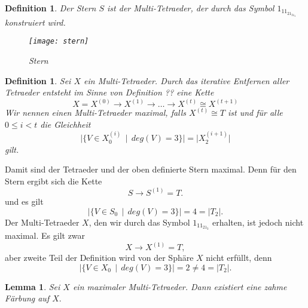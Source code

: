 \documentclass[12pt,titlepage,twoside,cleardoublepage]{article}
\theoremstyle{nummermitklammern}
\newtheorem{lemma}[temp]{Lemma}
\newtheorem{definition}[temp]{Definition}
\newtheorem{definition}[zahl]{Definition}
\newtheorem{lemma}[zahl]{Lemma}
\numberwithin{equation}{section}
\begin{document}
\begin{definition}
Der \emph{Stern} $S$ ist der Multi-Tetraeder, der durch das Symbol $1_11_21_31_4$ konstruiert wird.
\begin{figure}[H]
\begin{center}
\texttt{[image: stern]}
\end{center}
\caption{Stern}
\end{figure}
\end{definition}
\begin{definition}
Sei $X$ ein Multi-Tetraeder. Durch das iterative Entfernen aller Tetraeder entsteht im Sinne von Definition ?? eine Kette 
\[
X=X^{(0)}\to X^{(1)}\to \ldots \to X^{(t)}\cong X^{(t+1)}
\]
Wir nennen einen Multi-Tetraeder \emph{maximal}, falls $X^{(t)}\cong T$ ist und für alle $0\leq i< t$ die Gleichheit
\[
\vert \{V\in X_0^{(i)}\,\mid \, deg(V)=3\}\vert=\vert X^{(i+1)}_2\vert 
\]
gilt.
\end{definition}
Damit sind der Tetraeder und der oben definierte Stern maximal. 
Denn für den Stern ergibt sich die Kette 
\[
S\to S^{(1)}=T.
\]
und es gilt 
\[
\vert \{V\in S_0\,\mid \, deg(V)=3\}\vert=4=\vert T_2\vert .
\]
Der Multi-Tetraeder $X$, den wir durch das Symbol $1_11_21_3$ erhalten, ist jedoch nicht maximal. Es gilt zwar
\[
X\to X^{(1)}=T,
\] 
aber zweite Teil der Definition wird von der Sphäre $X$ nicht erfüllt, denn 
\[
\vert \{V\in X_0\,\mid \, deg(V)=3\}\vert=2\neq 4=\vert T_2\vert.
\]
\begin{lemma}
Sei $X$ ein maximaler Multi-Tetraeder. Dann existiert eine zahme Färbung auf $X.$
\end{lemma}
\end{document}
